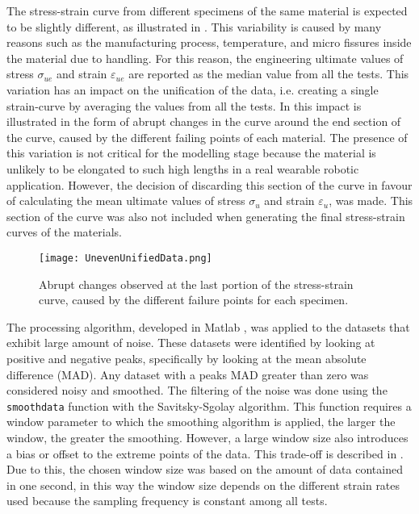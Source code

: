 The stress-strain curve from different specimens of the same material is expected to be slightly different, as illustrated in . This variability is caused by many reasons such as the manufacturing process, temperature, and micro fissures inside the material due to handling. For this reason, the engineering ultimate values of stress $\sigma_{ue}$ and strain $\varepsilon_{ue}$ are reported as the median value from all the tests. This variation has an impact on the unification of the data, i.e. creating a single strain-curve by averaging the values from all the tests. In  this impact is illustrated in the form of abrupt changes in the curve around the end section of the curve, caused by the different failing points of each material. The presence of this variation is not critical for the modelling stage because the material is unlikely to be elongated to such high lengths in a real wearable robotic application. However, the decision of discarding this section of the curve in favour of calculating the mean ultimate values of stress $\sigma_u$ and strain $\varepsilon_u$, was made. This section of the curve was also not included when generating the final stress-strain curves of the materials.

\begin{figure}[htb!]
    \centering
    \texttt{[image: UnevenUnifiedData.png]}
    \caption{Abrupt changes observed at the last portion of the stress-strain curve, caused by the different failure points for each specimen.}
    \label{fig:unevenData}
\end{figure}

The processing algorithm, developed in Matlab \textregistered{}, was applied to the datasets that exhibit large amount of noise. These datasets were identified by looking at positive and negative peaks, specifically by looking at the mean absolute difference (MAD). Any dataset with a peaks MAD greater than zero was considered noisy and smoothed. The filtering of the noise was done using the \texttt{smoothdata} function with the Savitsky-Sgolay algorithm. This function requires a window parameter to which the smoothing algorithm is applied, the larger the window, the greater the smoothing. However, a large window size also introduces a bias or offset to the extreme points of the data. This trade-off is described in \cite{sadeghi2018optimum}. Due to this, the chosen window size was based on the amount of data contained in one second, in this way the window size depends on the different strain rates used because the sampling frequency is constant among all tests. 

